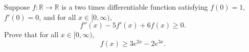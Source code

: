 \documentclass{article}
\begin{document}
\setlength{\parindent}{0pt}
Suppose $f:\mathbb{R}\to\mathbb{R}$ is a two times differentiable function satisfying $f(0)=1$, $f'(0)=0$, and for all $x\in[0,\infty)$,$$f''(x)-5f'(x)+6f(x)\ge0.$$Prove that for all $x\in[0,\infty)$,$$f(x)\ge3e^{2x}-2e^{3x}.$$
\end{document}
